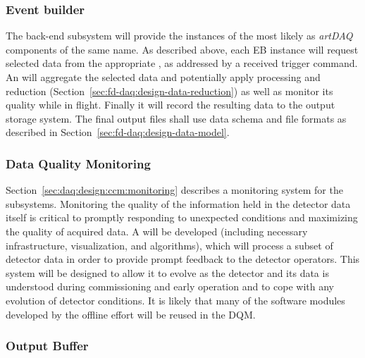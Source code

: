 \subsubsection{Event builder}
\label{sec:fd-daq:design-event-builder}

The  back-end subsystem will provide the instances of the  most likely as \textit{artDAQ}~\cite{artdaq} components of the same name.
As described above, each EB instance will request selected data from
the appropriate , as addressed by a received trigger command. 
An  will aggregate the selected data and potentially apply processing and reduction (Section~\ref{sec:fd-daq:design-data-reduction}) as well as monitor its quality while in flight.
Finally it will record the resulting data to the output storage system.
The final output files shall use data schema and file formats as described in Section~\ref{sec:fd-daq:design-data-model}.



\subsubsection{Data Quality Monitoring}
\label{sec:fd-daq:design-data-quality}

Section~\ref{sec:daq:design:ccm:monitoring} describes a monitoring system for the  subsystems. 
Monitoring the quality of the information held in the detector data itself is critical to promptly responding to unexpected conditions and maximizing the quality of acquired data. 
A   
will be developed (including necessary infrastructure, visualization,
and algorithms), which will process a subset of detector data in order
to provide prompt feedback to the detector operators. 
This system will be designed to allow it to evolve as the detector and its data is understood during commissioning and early operation and to cope with any evolution of detector conditions.
It is likely that many of the software modules developed by the
offline effort will be reused in the DQM.

\subsubsection{Output Buffer}

